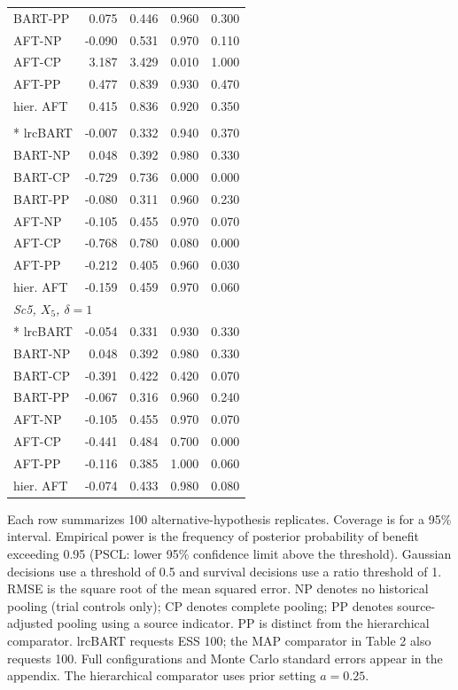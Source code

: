 \begin{longtable}{lrrrr}
BART-PP & 0.075 & 0.446 & 0.960 & 0.300 \\
AFT-NP & -0.090 & 0.531 & 0.970 & 0.110 \\
AFT-CP & 3.187 & 3.429 & 0.010 & 1.000 \\
AFT-PP & 0.477 & 0.839 & 0.930 & 0.470 \\
hier. AFT & 0.415 & 0.836 & 0.920 & 0.350 \\
\newpage
\multicolumn{5}{l}{\strut\textit{Sc4, $\delta=1$}}\\*
lrcBART & -0.007 & 0.332 & 0.940 & 0.370 \\
BART-NP & 0.048 & 0.392 & 0.980 & 0.330 \\
BART-CP & -0.729 & 0.736 & 0.000 & 0.000 \\
BART-PP & -0.080 & 0.311 & 0.960 & 0.230 \\
AFT-NP & -0.105 & 0.455 & 0.970 & 0.070 \\
AFT-CP & -0.768 & 0.780 & 0.080 & 0.000 \\
AFT-PP & -0.212 & 0.405 & 0.960 & 0.030 \\
hier. AFT & -0.159 & 0.459 & 0.970 & 0.060 \\
\multicolumn{5}{l}{\strut\textit{Sc5, $X_5$, $\delta=1$}}\\*
lrcBART & -0.054 & 0.331 & 0.930 & 0.330 \\
BART-NP & 0.048 & 0.392 & 0.980 & 0.330 \\
BART-CP & -0.391 & 0.422 & 0.420 & 0.070 \\
BART-PP & -0.067 & 0.316 & 0.960 & 0.240 \\
AFT-NP & -0.105 & 0.455 & 0.970 & 0.070 \\
AFT-CP & -0.441 & 0.484 & 0.700 & 0.000 \\
AFT-PP & -0.116 & 0.385 & 1.000 & 0.060 \\
hier. AFT & -0.074 & 0.433 & 0.980 & 0.080 \\
\end{longtable}
\noindent\begin{minipage}{\linewidth}\footnotesize Each row summarizes 100 alternative-hypothesis replicates. Coverage is for a 95\% interval. Empirical power is the frequency of posterior probability of benefit exceeding 0.95 (PSCL: lower 95\% confidence limit above the threshold). Gaussian decisions use a threshold of 0.5 and survival decisions use a ratio threshold of 1. RMSE is the square root of the mean squared error. NP denotes no historical pooling (trial controls only); CP denotes complete pooling; PP denotes source-adjusted pooling using a source indicator. PP is distinct from the hierarchical comparator. lrcBART requests ESS 100; the MAP comparator in Table 2 also requests 100. Full configurations and Monte Carlo standard errors appear in the appendix. The hierarchical comparator uses prior setting $a=0.25$.\end{minipage}
\endgroup
